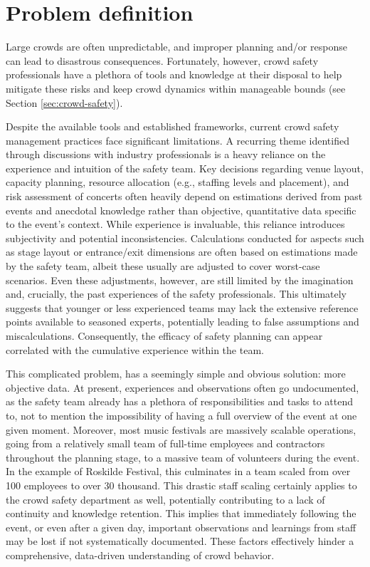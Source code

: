 \section{Problem definition}
\label{sec:problem-definition}
Large crowds are often unpredictable, and improper planning and/or response can lead to disastrous consequences. Fortunately, however, crowd safety professionals have a plethora of tools and knowledge at their disposal to help mitigate these risks and keep crowd dynamics within manageable bounds (see Section \ref{sec:crowd-safety}).

Despite the available tools and established frameworks, current crowd safety management practices face significant limitations. A recurring theme identified through discussions with industry professionals is a heavy reliance on the experience and intuition of the safety team. Key decisions regarding venue layout, capacity planning, resource allocation (e.g., staffing levels and placement), and risk assessment of concerts often heavily depend on estimations derived from past events and anecdotal knowledge rather than objective, quantitative data specific to the event's context. While experience is invaluable, this reliance introduces subjectivity and potential inconsistencies. Calculations conducted for aspects such as stage layout or entrance/exit dimensions are often based on estimations made by the safety team, albeit these usually are adjusted to cover worst-case scenarios. Even these adjustments, however, are still limited by the imagination and, crucially, the past experiences of the safety professionals. This ultimately suggests that younger or less experienced teams may lack the extensive reference points available to seasoned experts, potentially leading to false assumptions and miscalculations. Consequently, the efficacy of safety planning can appear correlated with the cumulative experience within the team.

This complicated problem, has a seemingly simple and obvious solution: more objective data. At present, experiences and observations often go undocumented, as the safety team already has a plethora of responsibilities and tasks to attend to, not to mention the impossibility of having a full overview of the event at one given moment. Moreover, most music festivals are massively scalable operations, going from a relatively small team of full-time employees and contractors throughout the planning stage, to a massive team of volunteers during the event. In the example of Roskilde Festival, this culminates in a team scaled from over 100 employees to over 30 thousand. This drastic staff scaling certainly applies to the crowd safety department as well, potentially contributing to a lack of continuity and knowledge retention. This implies that immediately following the event, or even after a given day, important observations and learnings from staff may be lost if not systematically documented. These factors effectively hinder a comprehensive, data-driven understanding of crowd behavior.

